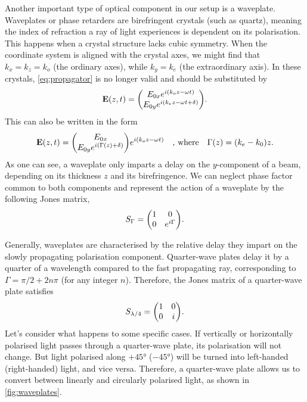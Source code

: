 Another important type of optical component in our setup is a waveplate. Waveplates or phase retarders are birefringent crystals (such as quartz), meaning the index of refraction a ray of light experiences is dependent on its polarisation. This happens when a crystal structure lacks cubic symmetry. When the coordinate system is aligned with the crystal axes, we might find that $ k_x = k_z = k_o $ (the ordinary axes), while $ k_y = k_e $ (the extraordinary axis). In these crystals, \autoref{eq:propagator} is no longer valid and should be substituted by
\begin{equation}
	\vb{E}(z, t) = \mqty(\Eox e^{i(k_o z-\omega t)} \\ \Eoy e^{i(k_e z-\omega t + \delta)} ).
\end{equation}
This can also be written in the form
\begin{equation}
	\vb{E}(z, t) = \mqty(\Eox  \\ \Eoy e^{i(\Gamma(z) + \delta)} ) e^{i(k_o z-\omega t)}
	\qq{, where}
	\Gamma(z) = (k_e-k_0) z.
\end{equation}
As one can see, a waveplate only imparts a delay on the $ y $-component of a beam, depending on its thickness $ z $ and its birefringence. We can neglect phase factor common to both components and represent the action of a waveplate by the following Jones matrix, 
\begin{equation}
	S_\Gamma = \mqty(1 & 0 \\ 0 & e^{i\Gamma}).
\end{equation}

Generally, waveplates are characterised by the relative delay they impart on the slowly propagating polarisation component. Quarter-wave plates delay it by a quarter of a wavelength compared to the fast propagating ray, corresponding to $ \Gamma = \pi/2 + 2n\pi $ (for any integer $ n $). Therefore, the Jones matrix of a quarter-wave plate satisfies 
\begin{equation}
	S_\qwp = \mqty(1 & 0 \\ 0 & i).
\end{equation}
Let's consider what happens to some specific cases. If vertically or horizontally polarised light passes through a quarter-wave plate, its polarisation will not change. But light polarised along $ +\ang{45} $ ($ -\ang{45} $) will be turned into left-handed (right-handed) light, and vice versa. Therefore, a quarter-wave plate allows us to convert between linearly and circularly polarised light, as shown in \autoref{fig:waveplates}.

